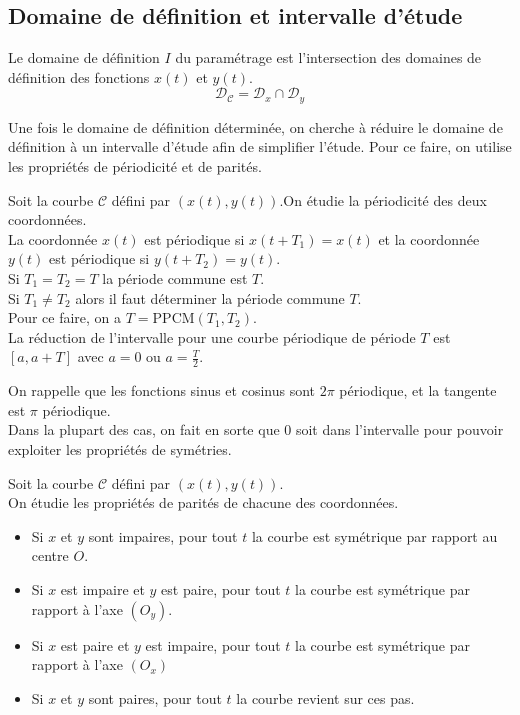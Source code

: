 \subsection{Domaine de définition et intervalle d'étude}
\begin{defi}
Le domaine de définition $I$ du paramétrage est l'intersection des domaines de définition des fonctions $x(t)$ et $y(t)$.
$$\mathscr{D}_\mathscr{C}=\mathscr{D}_x\cap\mathscr{D}_y$$
\end{defi}
Une fois le domaine de définition déterminée, on cherche à réduire le domaine de définition à un intervalle d'étude afin de simplifier l'étude.
Pour ce faire, on utilise les propriétés de périodicité et de parités.
\begin{prop}
Soit la courbe $\mathscr{C}$ défini par $(x(t),y(t))$.On étudie la périodicité des deux coordonnées.\\
La coordonnée $x(t)$ est périodique si $x(t+T_1)=x(t)$ et la coordonnée $y(t)$ est périodique si $y(t+T_2)=y(t)$.\\
\newline
Si $T_1=T_2=T$ la période commune est $T$.\\
Si $T_1\neq T_2$ alors il faut déterminer la période commune $T$.\\
Pour ce faire, on a $T=\text{PPCM}(T_1,T_2)$.\\
La réduction de l'intervalle pour une courbe périodique de période $T$ est $[a,a+T]$ avec $a=0$ ou $a=\frac{T}{2}$.
\end{prop}
On rappelle que les fonctions sinus et cosinus sont $2\pi$ périodique, et la tangente est $\pi$ périodique.\\
Dans la plupart des cas, on fait en sorte que $0$ soit dans l'intervalle pour pouvoir exploiter les propriétés de symétries.
\begin{prop}
Soit la courbe $\mathscr{C}$ défini par $(x(t),y(t))$.\\
On étudie les propriétés de parités de chacune des coordonnées.
\begin{itemize}
    \item Si $x$ et $y$ sont impaires, pour tout $t$ la courbe est symétrique par rapport au centre $O$.
    \item Si $x$ est impaire et $y$ est paire, pour tout $t$ la courbe est symétrique par rapport à l'axe $(O_y)$.
    \item Si $x$ est paire et $y$ est impaire, pour tout $t$ la courbe est symétrique par rapport à l'axe $(O_x)$
    \item Si $x$ et $y$ sont paires, pour tout $t$ la courbe revient sur ces pas.
\end{itemize}
\end{prop}
